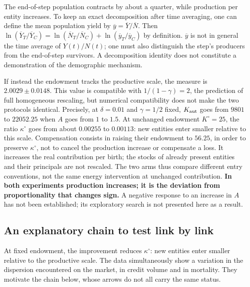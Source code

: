The end-of-step population contracts by about a quarter, while
production per entity increases. To keep an exact decomposition after
time averaging, one can define the mean population yield by
$\overline y=\overline Y/\overline N$. Then
$\ln(\overline Y_T/\overline Y_C)=
\ln(\overline N_T/\overline N_C)+\ln(\overline y_T/\overline y_C)$
by definition. $\overline y$ is not in general the time average of
$Y(t)/N(t)$; one must also distinguish the step's producers from the
end-of-step survivors. A decomposition identity does not constitute a
demonstration of the demographic mechanism.

If instead the endowment tracks the productive scale, the measure is
$2.0029\pm0.0148$. This value is compatible with $1/(1-\gamma)=2$, the
prediction of full homogeneous rescaling, but numerical compatibility
does not make the two protocols identical. Precisely, at $\delta=0.01$
and $\gamma=1/2$ fixed, $K_{\rm aut}$ goes from $9801$ to $22052.25$ when
$A$ goes from $1$ to $1.5$. At unchanged endowment $K^\circ=25$, the
ratio $\kappa^\circ$ goes from about $0.00255$ to $0.00113$: new
entities enter smaller relative to this scale. Compensation consists in
raising their endowment to $56.25$, in order to preserve $\kappa^\circ$,
not to cancel the production increase or compensate a loss. It
increases the real contribution per birth; the stocks of already
present entities and their principals are not rescaled. The two arms
thus compare different entry conventions, not the same energy
intervention at unchanged contribution.
\textbf{In both experiments production increases; it is the deviation
from proportionality that changes sign.} A negative response to an
increase in $A$ has not been established; its exploratory search is not
presented here as a result.

\subsection{An explanatory chain to test link by link}
At fixed endowment, the improvement reduces $\kappa^\circ$: new
entities enter smaller relative to the productive scale. The data
simultaneously show a variation in the dispersion encountered on the
market, in credit volume and in mortality. They motivate the chain
below, whose arrows do not all carry the same status.

